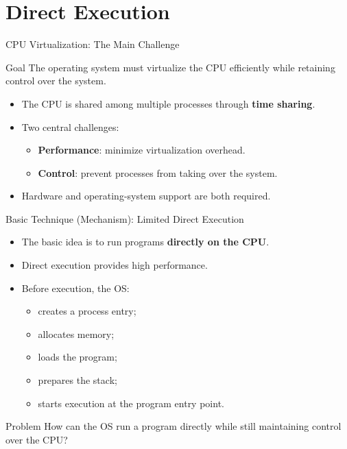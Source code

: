 
\section{Direct Execution}

\begin{frame}{CPU Virtualization: The Main Challenge}

\begin{block}{Goal}
The operating system must virtualize the CPU efficiently
while retaining control over the system.
\end{block}

\begin{itemize}
    \item The CPU is shared among multiple processes through
          \textbf{time sharing}.
    \item Two central challenges:
    \begin{itemize}
        \item \textbf{Performance}: minimize virtualization overhead.
        \item \textbf{Control}: prevent processes from taking over the system.
    \end{itemize}
    \item Hardware and operating-system support are both required.
\end{itemize}

\end{frame}

\begin{frame}{Basic Technique (Mechanism): Limited Direct Execution}

\begin{itemize}
    \item The basic idea is to run programs \textbf{directly on the CPU}.
    \item Direct execution provides high performance.
    \item Before execution, the OS:
    \begin{itemize}
        \item creates a process entry;
        \item allocates memory;
        \item loads the program;
        \item prepares the stack;
        \item starts execution at the program entry point.
    \end{itemize}
\end{itemize}

\begin{alertblock}{Problem}
How can the OS run a program directly while still maintaining
control over the CPU?
\end{alertblock}

\end{frame}

